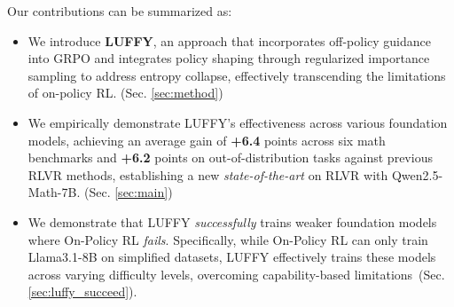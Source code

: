 \documentclass{article}
\begin{document}
Our contributions can be summarized as: 
\vspace{-0.5\baselineskip}
\begin{itemize}
\setlength{\topsep}{1pt}      %
\setlength{\itemsep}{1pt}
\setlength{\parskip}{1pt}
\setlength{\parsep}{1pt}
\item We introduce \textbf{LUFFY}, an approach that incorporates off-policy guidance into GRPO and integrates policy shaping through regularized importance sampling to address entropy collapse, effectively transcending the limitations of on-policy RL. (Sec. \ref{sec:method})
\item We empirically demonstrate LUFFY's effectiveness across various foundation models, achieving an average gain of \textbf{+6.4} points across six math benchmarks and \textbf{+6.2} points on out-of-distribution tasks against previous RLVR methods, establishing a new \textit{state-of-the-art} on RLVR with Qwen2.5-Math-7B. (Sec. \ref{sec:main})
\item We demonstrate that LUFFY \textit{successfully} trains weaker foundation models where On-Policy RL \textit{fails}. Specifically, while On-Policy RL can only train Llama3.1-8B on simplified datasets, LUFFY effectively trains these models across varying difficulty levels, overcoming capability-based limitations~(Sec. \ref{sec:luffy_succeed}).
\end{itemize}




\end{document}
